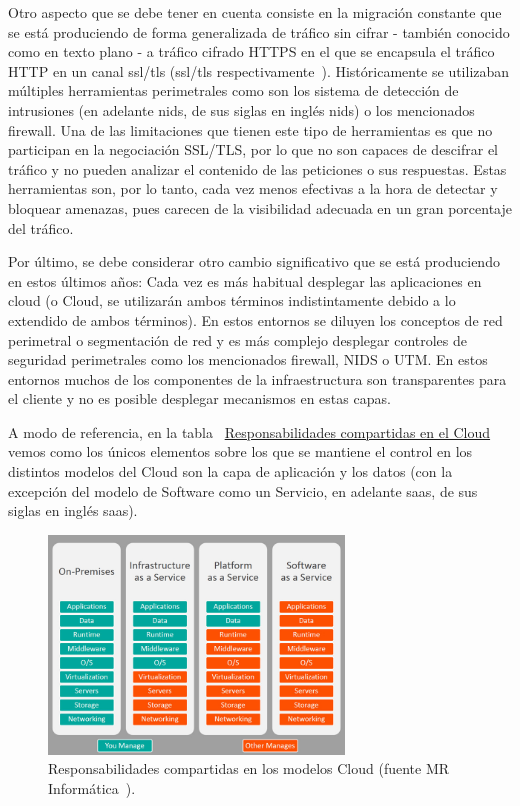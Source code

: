 \par Otro aspecto que se debe tener en cuenta consiste en la migración constante que se está produciendo de forma generalizada de tráfico sin cifrar - también
conocido como en texto plano - a tráfico cifrado HTTPS en el que se encapsula el tráfico HTTP en un canal \acrshort{ssl}/\acrshort{tls}
(\acrlong{ssl}/\acrlong{tls} respectivamente~\cite{wiki:ssltls}). Históricamente se utilizaban múltiples herramientas perimetrales como son los sistema de
detección de intrusiones (en adelante \acrshort{nids}, de sus siglas en inglés \acrlong{nids}) o los mencionados firewall. Una de las limitaciones que tienen
este tipo de herramientas es que no participan en la negociación SSL/TLS, por lo que no son capaces de descifrar el tráfico y no pueden analizar el contenido de
las peticiones o sus respuestas. Estas herramientas son, por lo tanto, cada vez menos efectivas a la hora de detectar y bloquear amenazas, pues carecen de la
visibilidad adecuada en un gran porcentaje del tráfico.
\par Por último, se debe considerar otro cambio significativo que se está produciendo en estos últimos años: Cada vez es más habitual desplegar las aplicaciones
en \gls{cloud} (o Cloud, se utilizarán ambos términos indistintamente debido a lo extendido de ambos términos). En estos entornos se diluyen los conceptos de
red perimetral o segmentación de red y es más complejo desplegar controles de seguridad perimetrales como los mencionados firewall, NIDS o UTM. En estos
entornos muchos de los componentes de la infraestructura son transparentes para el cliente y no es posible desplegar mecanismos en estas capas.
\par A modo de referencia, en la tabla {~\hyperref[fig:Responsabilidadescloud]{Responsabilidades compartidas en el Cloud}} vemos como los únicos elementos sobre
los que se mantiene el control en los distintos modelos del Cloud son la capa de aplicación y los datos (con la excepción del modelo de Software como un
Servicio, en adelante \acrshort{saas}, de sus siglas en inglés \acrlong{saas}).
\begin{figure}[hp]
  \centering
  \label{fig:Responsabilidadescloud}
  \includegraphics[width=0.7\textwidth]{fig/Responsabilidadescloud}
  \caption{Responsabilidades compartidas en los modelos Cloud (fuente MR Informática~\cite{Responsabilidadescloud}).}
\end{figure}

